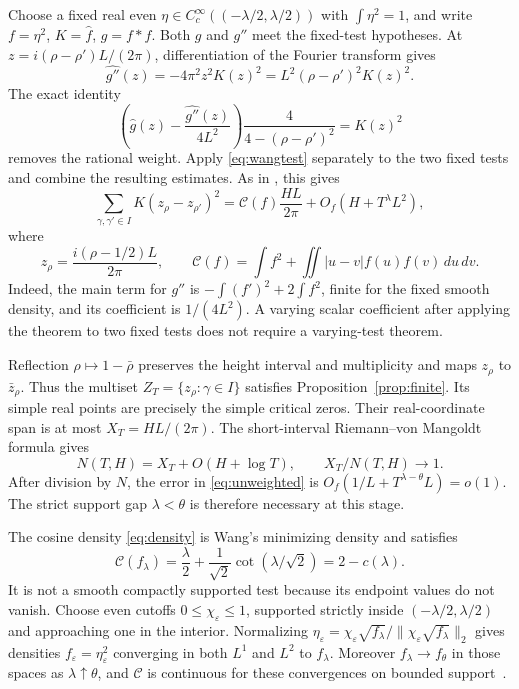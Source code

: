 ﻿\documentclass[11pt]{article}
\theoremstyle{remark}
\newcommand{\cC}{\mathcal C}
\begin{document}
Choose a fixed real even $\eta\in C_c^\infty((-\lambda/2,\lambda/2))$
with $\int\eta^2=1$, and write $f=\eta^2$, $K=\widehat f$, $g=f*f$.
Both $g$ and $g''$ meet the fixed-test hypotheses. At
$z=i(\rho-\rho')L/(2\pi)$, differentiation of the Fourier transform gives
\[
 \widehat {g''}(z)=-4\pi^2z^2K(z)^2
                  =L^2(\rho-\rho')^2K(z)^2.
\]
The exact identity
\[
 \left(\widehat g(z)-\frac{\widehat {g''}(z)}{4L^2}\right)
 \frac4{4-(\rho-\rho')^2}=K(z)^2
\]
removes the rational weight. Apply \eqref{eq:wangtest} separately to
the two fixed tests and combine the resulting estimates. As in
\cite[Lemma 3.1]{Wang}, this gives
\begin{equation}\label{eq:unweighted}
 \sum_{\gamma,\gamma'\in I}K(z_\rho-z_{\rho'})^2
 =\cC(f)\frac{HL}{2\pi}+O_f(H+T^\lambda L^2),
\end{equation}
where
\begin{equation}\label{eq:functional}
 z_\rho=\frac{i(\rho-1/2)L}{2\pi},\qquad
 \cC(f)=\int f^2+\iint|u-v|f(u)f(v)\,du\,dv.
\end{equation}
Indeed, the main term for $g''$ is
$-\int(f')^2+2\int f^2$, finite for the fixed smooth density, and its
coefficient is $1/(4L^2)$. A varying scalar coefficient after applying
the theorem to two fixed tests does not require a varying-test theorem.

Reflection $\rho\mapsto1-\bar\rho$ preserves the height interval and
multiplicity and maps $z_\rho$ to $\bar z_\rho$. Thus the multiset
$Z_T=\{z_\rho:\gamma\in I\}$ satisfies Proposition~\ref{prop:finite}.
Its simple real points are precisely the simple critical zeros. Their
real-coordinate span is at most $X_T=HL/(2\pi)$. The short-interval
Riemann--von Mangoldt formula gives
\begin{equation}\label{eq:normalization}
 N(T,H)=X_T+O(H+\log T),\qquad X_T/N(T,H)\longrightarrow1.
\end{equation}
After division by $N$, the error in \eqref{eq:unweighted} is
$O_f(1/L+T^{\lambda-\theta}L)=o(1)$. The strict support gap
$\lambda<\theta$ is therefore necessary at this stage.

The cosine density \eqref{eq:density} is Wang's minimizing density and
satisfies
\begin{equation}\label{eq:cost}
 \cC(f_\lambda)=\frac\lambda2+
         \frac1{\sqrt2}\cot(\lambda/\sqrt2)=2-c(\lambda).
\end{equation}
It is not a smooth compactly supported test because its endpoint values
do not vanish. Choose even cutoffs $0\le\chi_\varepsilon\le1$, supported
strictly inside $(-\lambda/2,\lambda/2)$ and approaching one in the
interior. Normalizing $\eta_\varepsilon=\chi_\varepsilon\sqrt{f_\lambda}/
\|\chi_\varepsilon\sqrt{f_\lambda}\|_2$ gives densities
$f_\varepsilon=\eta_\varepsilon^2$ converging in both $L^1$ and $L^2$
to $f_\lambda$. Moreover $f_\lambda\to f_\theta$ in those spaces as
$\lambda\uparrow\theta$, and $\cC$ is continuous for these convergences
on bounded support~\cite[Section 4]{Wang}.
\end{document}
